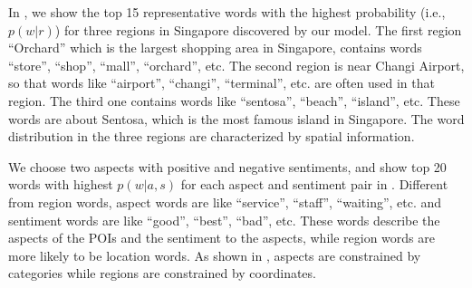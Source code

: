 In ,
we show the top 15 representative words with the highest
probability (i.e., $p(w|r)$) for three regions
in Singapore discovered by our model.
The first region ``Orchard'' which is the largest shopping
area in Singapore,
contains words ``store'', ``shop'', ``mall'', ``orchard'', etc.
The second region is near Changi Airport, so that words
like ``airport'', ``changi'', ``terminal'', etc. are often
used in that region. The third one contains words like
``sentosa'', ``beach'', ``island'', etc.
These words are about
Sentosa, which is the most famous island in Singapore.
The word distribution in the three regions are characterized
by spatial information.

We choose two aspects with positive and negative sentiments, and show
top 20 words with highest $p(w|a,s)$ for each aspect and sentiment
pair in .
Different from region words, aspect words are like
``service'', ``staff'', ``waiting'', etc. and sentiment
words are like ``good'', ``best'', ``bad'', etc. These words
describe the aspects of the POIs and the sentiment
to the aspects, while region words
are more likely to be location words.
As shown in ,
aspects are constrained by categories while regions are constrained
by coordinates.

